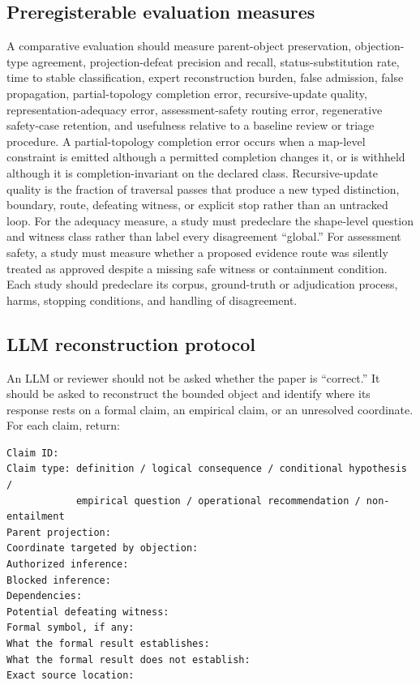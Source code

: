 \documentclass[10pt]{article}
\begin{document}
\subsection{Preregisterable evaluation measures}

A comparative evaluation should measure parent-object preservation, objection-type agreement, projection-defeat precision and recall, status-substitution rate, time to stable classification, expert reconstruction burden, false admission, false propagation, partial-topology completion error, recursive-update quality, representation-adequacy error, assessment-safety routing error, regenerative safety-case retention, and usefulness relative to a baseline review or triage procedure. A partial-topology completion error occurs when a map-level constraint is emitted although a permitted completion changes it, or is withheld although it is completion-invariant on the declared class. Recursive-update quality is the fraction of traversal passes that produce a new typed distinction, boundary, route, defeating witness, or explicit stop rather than an untracked loop. For the adequacy measure, a study must predeclare the shape-level question and witness class rather than label every disagreement ``global.'' For assessment safety, a study must measure whether a proposed evidence route was silently treated as approved despite a missing safe witness or containment condition. Each study should predeclare its corpus, ground-truth or adjudication process, harms, stopping conditions, and handling of disagreement.

\subsection{LLM reconstruction protocol}

An LLM or reviewer should not be asked whether the paper is ``correct.'' It should be asked to reconstruct the bounded object and identify where its response rests on a formal claim, an empirical claim, or an unresolved coordinate. For each claim, return:

\begin{lstlisting}
Claim ID:
Claim type: definition / logical consequence / conditional hypothesis /
            empirical question / operational recommendation / non-entailment
Parent projection:
Coordinate targeted by objection:
Authorized inference:
Blocked inference:
Dependencies:
Potential defeating witness:
Formal symbol, if any:
What the formal result establishes:
What the formal result does not establish:
Exact source location:
\end{lstlisting}
\end{document}
